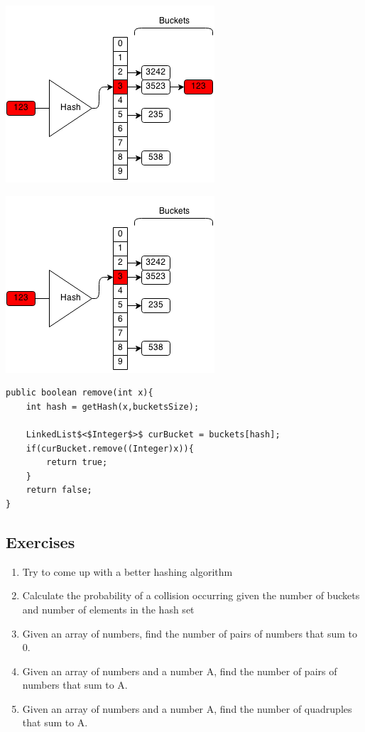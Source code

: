 \documentclass[11pt,oneside]{book}
\makeatletter
\def\maxwidth#1{\ifdim\Gin@nat@width>#1 #1\else\Gin@nat@width\fi}
\makeatother
\begin{document}
\includegraphics[width=\maxwidth{\textwidth}]{hashsetrem2.png}

\includegraphics[width=\maxwidth{\textwidth}]{hashsetrem3.png}

\begin{lstlisting}
public boolean remove(int x){
    int hash = getHash(x,bucketsSize);
    
    LinkedList$<$Integer$>$ curBucket = buckets[hash];
    if(curBucket.remove((Integer)x)){
        return true;
    }
    return false;
}
\end{lstlisting}

\subsection{Exercises}

\begin{enumerate}
\item Try to come up with a better hashing algorithm
\item Calculate the probability of a collision occurring given the number of buckets and number of elements in the hash set
\item Given an array of numbers, find the number of pairs of numbers that sum to 0.
\item Given an array of numbers and a number A, find the number of pairs of numbers that sum to A.
\item Given an array of numbers and a number A, find the number of quadruples that sum to A.
\end{enumerate}
\end{document}
